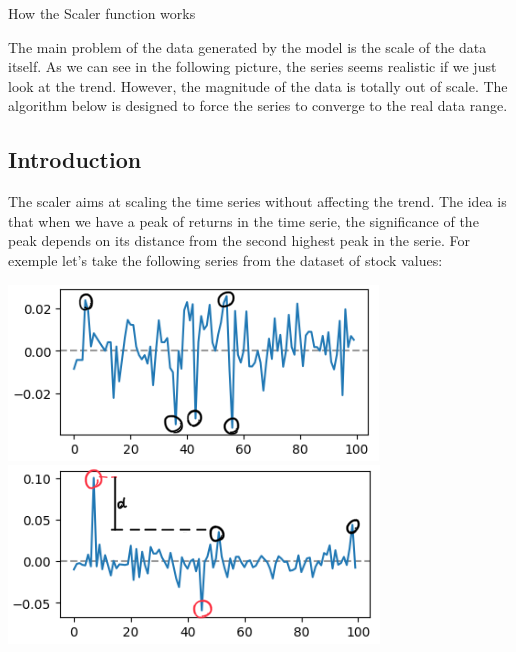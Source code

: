 \documentclass{article}
\begin{document}
\vspace{0.3cm}
\begin{center}
    {\huge{How the Scaler function works}}
\end{center}    
    \begin{multicols}{2}
    The main problem of the data generated by the model is the scale of the data itself.
    As we can see in the following picture, the series seems realistic if we just look at the trend.
    However, the magnitude of the data is totally out of scale. The algorithm below is designed to force
    the series to converge to the real data range.
    \subsection*{Introduction}
    The scaler aims at scaling the time series without affecting the trend. The idea is that when we have 
    a peak of returns in the time serie, the significance of the peak depends on its distance from the second highest peak in the serie. For exemple let's take the following series from the dataset of stock values:\\
    \begin{center}
        \includegraphics[scale = 0.7]{imgs/riccardo/small_peaks.png}
        \includegraphics[scale = 0.7]{imgs/riccardo/big_peaks.png}\\
    \end{center}

\end{multicols}
\end{document}
